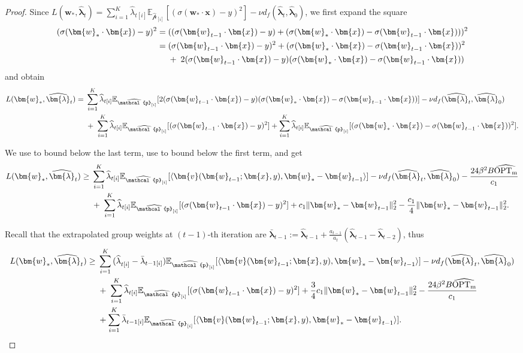 \documentclass[11pt]{article}
\numberwithin{thm}{section}
\theoremstyle{plain}
\theoremstyle{definition}
\theoremstyle{remark} \newtheorem{remark}[thm]{Remark}
\def\vlambda{{\bm{\lambda}}}
\def\vv{{\bm{v}}}
\def\vw{{\bm{w}}}
\def\vx{{\bm{x}}}
\def\ep{\widehat{\mathcal{p}}}
\newcommand{\E}{\mathbb{E}}
\newcommand{\innp}[1]{\langle #1 \rangle}
\DeclarePairedDelimiter\norm{\|}{\|}
\newcommand{\epi}{\ep_{[i]}}
\newcommand{\elambda}{\widehat{\lambda}}
\newcommand{\evlambda}{\widehat{\vlambda}}
\DeclareMathOperator{\mOPT}{OPT_m}
\newcommand{\mOPThat}{\widehat{\mOPT}}
\begin{document}
\begin{proof} Since \(L(\vw_*, \evlambda_t)=\sum_{i=1}^K\elambda_{t[i]}\E_{\epi}[(\sigma(\vw_*\cdot \vx)-y)^2]-\nu d_f(\evlambda_t, \evlambda_0)\), we first expand the square 
\begin{align}\label{eq:diff-of-squares}
		(\sigma(\vw_*\cdot \vx)-y)^2
		= \; & ((\sigma(\vw_{t-1}\cdot \vx)-y)+(\sigma(\vw_*\cdot \vx)-\sigma(\vw_{t-1}\cdot \vx)))^2\notag\\
		= \; & (\sigma(\vw_{t-1}\cdot \vx)-y)^2+(\sigma(\vw_*\cdot \vx)-\sigma(\vw_{t-1}\cdot \vx))^2\notag \\
		&+ \;2(\sigma(\vw_{t-1}\cdot \vx)-y)(\sigma(\vw_*\cdot \vx)-\sigma(\vw_{t-1}\cdot \vx))
\end{align}
    and obtain
\begin{align*}
		L(\vw_*, \evlambda_t)
		= \; & \sum_{i=1}^K{\elambda}_{t[i]}\E_{\epi}[2(\sigma(\vw_{t-1}\cdot \vx)-y)(\sigma(\vw_*\cdot \vx)-\sigma(\vw_{t-1}\cdot \vx))] -\nu d_f(\evlambda_t, \evlambda_0)\notag \\
&+ \; \sum_{i=1}^K{\elambda}_{t[i]}\E_{\epi}[(\sigma(\vw_{t-1}\cdot \vx)-y)^2]+\sum_{i=1}^K{\elambda}_{t[i]}\E_{\epi}[(\sigma(\vw_*\cdot \vx)-\sigma(\vw_{t-1}\cdot \vx))^2].\notag
	\end{align*}    

    We use  to bound below the last term, use  to bound below the first term, and get
    \begin{align}
        L(\vw_*, \evlambda_t)
		\ge \; & \sum_{i=1}^K{\elambda}_{t[i]}\E_{\epi}[\innp{\vv(\vw_{t-1};\vx,y), \vw_*-\vw_{t-1}}]  -\nu d_f(\evlambda_t, \evlambda_0) - \frac{24\beta^2B\mOPThat}{c_1} \notag \\
&+ \; \sum_{i=1}^K{\elambda}_{t[i]}\E_{\epi}[(\sigma(\vw_{t-1}\cdot \vx)-y)^2] + c_1\norm{\vw_*-\vw_{t-1}}_2^2  -\frac{c_1}{4}\norm{\vw_*-\vw_{t-1}}_2^2. \notag
    \end{align}
	
Recall that the extrapolated group weights at \((t-1)\)-th iteration are \(\bar{\vlambda}_{t-1}:=\evlambda_{t-1}+\frac{a_{t-1}}{a_t}(\evlambda_{t-1}-\evlambda_{t-2})\), thus 
    \begin{align}
        L(\vw_*, \evlambda_t)
		\ge \; & 
        \sum_{i=1}^K{(\elambda}_{t[i]} -\bar\lambda_{t-1[i]})\E_{\epi}[\innp{\vv(\vw_{t-1};\vx,y), \vw_*-\vw_{t-1}}]  -\nu d_f(\evlambda_t, \evlambda_0) \notag \\
&+ \; \sum_{i=1}^K\elambda_{t[i]}  \E_{\epi}[(\sigma(\vw_{t-1}\cdot \vx)-y)^2] + \frac34 c_1\norm{\vw_*-\vw_{t-1}}_2^2 - \frac{24\beta^2B\mOPThat}{c_1} \notag \\
        &  + \sum_{i=1}^K\bar\lambda_{t-1[i]}\E_{\epi}[\innp{\vv(\vw_{t-1};\vx,y), \vw_*-\vw_{t-1}}].\label{eq:lower-bound}
    \end{align}


\end{proof}
\end{document}
